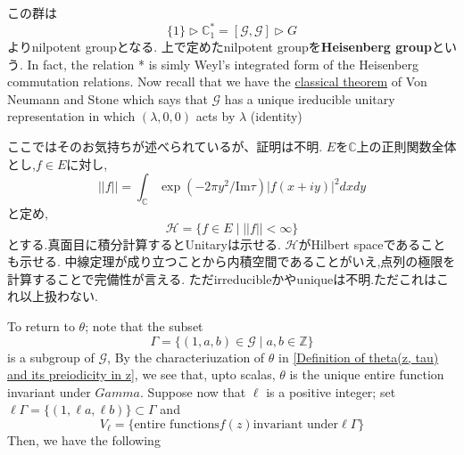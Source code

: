 \documentclass[uplatex,b5j,11pt]{jsbook}
\begin{document}
この群は
\begin{equation*}
 \{1\} 	\vartriangleright  \mathbb{C}^*_{1} = [\mathcal{G}, \mathcal{G}]  \vartriangleright G
\end{equation*}
よりnilpotent groupとなる.
上で定めたnilpotent groupを\textbf{Heisenberg group}という.
In fact, the relation * is simly Weyl's integrated form of the Heisenberg commutation relations. Now recall that we have the \underline{classical theorem} of Von Neumann and Stone which says that $\mathcal{G}$ has a unique ireducible unitary representation in which $(\lambda, 0, 0)$ acts by $\lambda$ (identity)

ここではそのお気持ちが述べられているが、証明は不明.
$E$を$\mathbb{C}$上の正則関数全体とし,$f \in E$に対し,
\begin{equation*}
 ||f|| = \int_{\mathbb{C}} \exp(-2\pi y^2/ \mathrm{Im}\tau) |f(x+iy)|^{2}dxdy
\end{equation*}
と定め,
\begin{equation*}
\mathcal{H} =\{ f \in E \mid ||f|| < \infty\}
\end{equation*}
とする.真面目に積分計算するとUnitaryは示せる.
$\mathcal{H}$がHilbert spaceであることも示せる.
中線定理が成り立つことから内積空間であることがいえ,点列の極限を計算することで完備性が言える.
ただirreducibleかやuniqueは不明.ただこれはこれ以上扱わない.

To return to $\theta$; note that the subset
\begin{equation*}
 \Gamma = \{(1,a,b) \in \mathcal{G} \mid a,b \in \mathbb{Z}\}
\end{equation*}
is a subgroup of $\mathcal{G}$, By the characteriuzation of $\theta$ in \ref{Definition of theta(z, tau) and its preiodicity in z},
we see that, upto scalas, $\theta$ is the unique entire function invariant under $Gamma$. Suppose now that $\ell$ is a positive integer; set $\ell \Gamma = \{(1, \ell a, \ell b)\} \subset \Gamma$ and
\begin{equation*}
 V_{\ell} = \{\mbox{entire functions} f(z) \mbox{invariant under} \ell \Gamma\}
\end{equation*}
Then, we have the following
\end{document}
